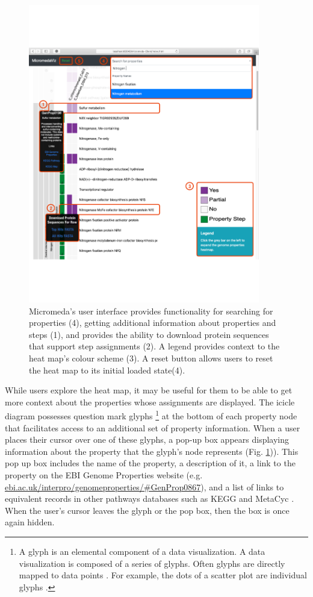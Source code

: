 \begin{figure}[!ht]
  \centering
	\includegraphics[width=0.9\textwidth]{media/micromeda-interface.pdf}
	 \caption{Micromeda's user interface provides functionality for searching for properties (4), getting additional information about properties and steps (1), and provides the ability to download protein sequences that support step assignments (2). A legend provides context to the heat map's colour scheme (3). A reset button allows users to reset the heat map to its initial loaded state(4).}
	 \label{fig:micromeda-interface}
\end{figure}

While users explore the heat map, it may be useful for them to be able to get more context about the properties whose assignments are displayed. The icicle diagram possesses question mark glyphs \footnote{A glyph is an elemental component of a data visualization. A data visualization is composed of a series of glyphs. Often glyphs are directly mapped to data points \cite{chen}. For example, the dots of a scatter plot are individual glyphs \cite{chen}.} at the bottom of each property node that facilitates access to an additional set of property information. When a user places their cursor over one of these glyphs, a pop-up box appears displaying information about the property that the glyph's node represents (Fig. \ref{fig:micromeda-interface})). This pop up box includes the name of the property, a description of it, a link to the property on the EBI Genome Properties website (e.g. \href{ebi.ac.uk/interpro/genomeproperties/\#GenProp0867}{ebi.ac.uk/interpro/genomeproperties/\#GenProp0867}), and a list of links to equivalent records in other pathways databases such as KEGG \cite{kanehisa2000kegg} and MetaCyc \cite{karp2002metacyc}. When the user's cursor leaves the glyph or the pop box, then the box is once again hidden.

